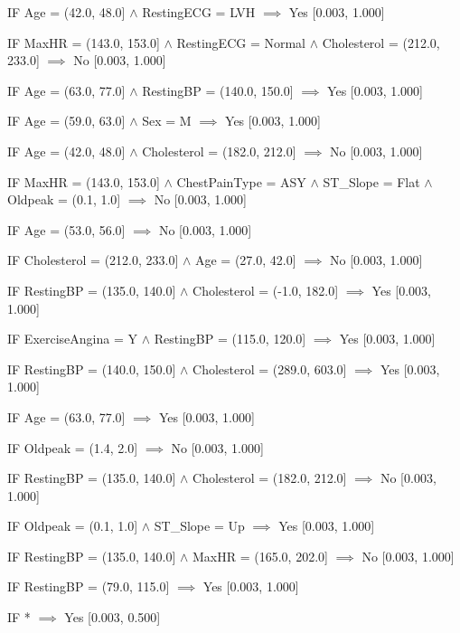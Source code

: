 IF Age = (42.0, 48.0] $\land$ RestingECG = LVH $\implies$ Yes [0.003, 1.000]

IF MaxHR = (143.0, 153.0] $\land$ RestingECG = Normal $\land$ Cholesterol = (212.0, 233.0] $\implies$ No [0.003, 1.000]

IF Age = (63.0, 77.0] $\land$ RestingBP = (140.0, 150.0] $\implies$ Yes [0.003, 1.000]

IF Age = (59.0, 63.0] $\land$ Sex = M $\implies$ Yes [0.003, 1.000]

IF Age = (42.0, 48.0] $\land$ Cholesterol = (182.0, 212.0] $\implies$ No [0.003, 1.000]

IF MaxHR = (143.0, 153.0] $\land$ ChestPainType = ASY $\land$ ST_Slope = Flat $\land$ Oldpeak = (0.1, 1.0] $\implies$ No [0.003, 1.000]

IF Age = (53.0, 56.0] $\implies$ No [0.003, 1.000]

IF Cholesterol = (212.0, 233.0] $\land$ Age = (27.0, 42.0] $\implies$ No [0.003, 1.000]

IF RestingBP = (135.0, 140.0] $\land$ Cholesterol = (-1.0, 182.0] $\implies$ Yes [0.003, 1.000]

IF ExerciseAngina = Y $\land$ RestingBP = (115.0, 120.0] $\implies$ Yes [0.003, 1.000]

IF RestingBP = (140.0, 150.0] $\land$ Cholesterol = (289.0, 603.0] $\implies$ Yes [0.003, 1.000]

IF Age = (63.0, 77.0] $\implies$ Yes [0.003, 1.000]

IF Oldpeak = (1.4, 2.0] $\implies$ No [0.003, 1.000]

IF RestingBP = (135.0, 140.0] $\land$ Cholesterol = (182.0, 212.0] $\implies$ No [0.003, 1.000]

IF Oldpeak = (0.1, 1.0] $\land$ ST_Slope = Up $\implies$ Yes [0.003, 1.000]

IF RestingBP = (135.0, 140.0] $\land$ MaxHR = (165.0, 202.0] $\implies$ No [0.003, 1.000]

IF RestingBP = (79.0, 115.0] $\implies$ Yes [0.003, 1.000]

IF * $\implies$ Yes [0.003, 0.500]
